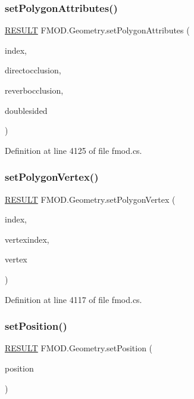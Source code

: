 \subsubsection{\texorpdfstring{set\+Polygon\+Attributes()}{setPolygonAttributes()}}
{\footnotesize\ttfamily \hyperlink{namespace_f_m_o_d_a305d1176ef3f8c8815861a60407ac33d}{R\+E\+S\+U\+LT} F\+M\+O\+D.\+Geometry.\+set\+Polygon\+Attributes (\begin{DoxyParamCaption}\item[{int}]{index,  }\item[{float}]{directocclusion,  }\item[{float}]{reverbocclusion,  }\item[{bool}]{doublesided }\end{DoxyParamCaption})}



Definition at line 4125 of file fmod.\+cs.

\mbox{\label{class_f_m_o_d_1_1_geometry_aaaafc144eb110ffd6f0c251d54057782}} 
\subsubsection{\texorpdfstring{set\+Polygon\+Vertex()}{setPolygonVertex()}}
{\footnotesize\ttfamily \hyperlink{namespace_f_m_o_d_a305d1176ef3f8c8815861a60407ac33d}{R\+E\+S\+U\+LT} F\+M\+O\+D.\+Geometry.\+set\+Polygon\+Vertex (\begin{DoxyParamCaption}\item[{int}]{index,  }\item[{int}]{vertexindex,  }\item[{ref \hyperlink{struct_f_m_o_d_1_1_v_e_c_t_o_r}{V\+E\+C\+T\+OR}}]{vertex }\end{DoxyParamCaption})}



Definition at line 4117 of file fmod.\+cs.

\mbox{\label{class_f_m_o_d_1_1_geometry_a6a9ffd3421759d70a2b406e3982eaad1}} 
\subsubsection{\texorpdfstring{set\+Position()}{setPosition()}}
{\footnotesize\ttfamily \hyperlink{namespace_f_m_o_d_a305d1176ef3f8c8815861a60407ac33d}{R\+E\+S\+U\+LT} F\+M\+O\+D.\+Geometry.\+set\+Position (\begin{DoxyParamCaption}\item[{ref \hyperlink{struct_f_m_o_d_1_1_v_e_c_t_o_r}{V\+E\+C\+T\+OR}}]{position }\end{DoxyParamCaption})}



